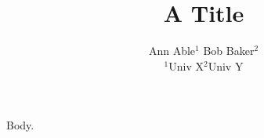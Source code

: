 \documentclass{article}
\newcommand{\uni}{Univ X}
\begin{document}
\title{A Title}
\author{\begin{minipage}[t]{\textwidth}
\centering Ann Able$^{1}$ \quad Bob Baker$^{2}$\\[0.6em]
$^{1}$\uni \quad$^{2}$Univ Y
\end{minipage}}
\maketitle
\renewcommand{\uni}{Univ Q}
Body.
\end{document}
